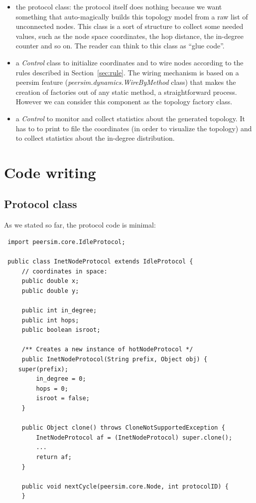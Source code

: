 \documentclass[a4paper,12pt]{article}
\begin{document}
\begin{itemize}

\item the protocol class: the protocol itself does nothing because 
we want something that auto-magically builds this topology model from 
a raw list of unconnected nodes. This class is a sort of structure to
collect some needed values, such as the node space coordinates, the
hop distance, the in-degree counter and so on.  
The reader can think to this class as ``glue code''.
 
\item a \emph{Control} class to initialize coordinates and to wire nodes
  according to the rules described in Section~\ref{sec:rule}. The
  wiring mechanism is based on a peersim feature
  (\emph{peersim.dynamics.WireByMethod} class) that makes the creation of
  factories out of any static method, a straightforward
  process. However we can consider this component as the topology
  factory class. 

\item a \emph{Control} to monitor and collect statistics about the
  generated topology. It has to to print to file the coordinates (in
  order to visualize the topology) and to collect statistics about the
  in-degree distribution.

\end{itemize}

\section{Code writing}

\subsection{Protocol class}

As we stated so far, the protocol code is minimal:

\footnotesize
\begin{verbatim}
 import peersim.core.IdleProtocol;
 
 public class InetNodeProtocol extends IdleProtocol {
     // coordinates in space:
     public double x;
     public double y;
     
     public int in_degree;
     public int hops;
     public boolean isroot;
    
     /** Creates a new instance of hotNodeProtocol */
     public InetNodeProtocol(String prefix, Object obj) {
    super(prefix);
         in_degree = 0;
         hops = 0;
         isroot = false;
     }
     
     public Object clone() throws CloneNotSupportedException {
         InetNodeProtocol af = (InetNodeProtocol) super.clone();
         ...
         return af;
     }
    
     public void nextCycle(peersim.core.Node, int protocolID) {
     }

\end{verbatim}
\normalsize
\end{document}
